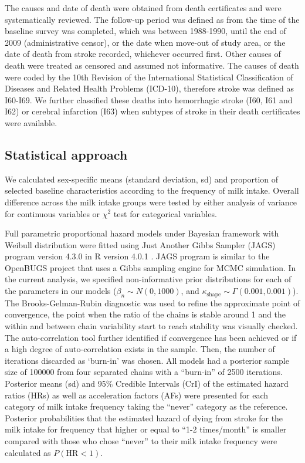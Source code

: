 \documentclass[nutrients,article,submit,moreauthors,pdftex]{mdpi}
\begin{document}
The causes and date of death were obtained from death certificates and
were systematically reviewed. The follow-up period was defined as from
the time of the baseline survey was completed, which was between
1988-1990, until the end of 2009 (administrative censor), or the date
when move-out of study area, or the date of death from stroke recorded,
whichever occurred first. Other causes of death were treated as censored
and assumed not informative. The causes of death were coded by the 10th
Revision of the International Statistical Classification of Diseases and
Related Health Problems (ICD-10), therefore stroke was defined as
I60-I69. We further classified these deaths into hemorrhagic stroke
(I60, I61 and I62) or cerebral infarction (I63) when subtypes of stroke
in their death certificates were available.

\hypertarget{statistical-approach}{%
\subsection{Statistical approach}\label{statistical-approach}}

We calculated sex-specific means (standard deviation, sd) and proportion
of selected baseline characteristics according to the frequency of milk
intake. Overall difference across the milk intake groups were tested by
either analysis of variance for continuous variables or \(\chi^2\) test
for categorical variables.

Full parametric proportional hazard models under Bayesian framework with
Weibull distribution were fitted using Just Another Gibbs Sampler (JAGS)
program \citep{Plummer2003} version 4.3.0 in R version 4.0.1
\citep{RCT2020}. JAGS program is similar to the OpenBUGS
\citep{Lunn2009} project that uses a Gibbs sampling engine for MCMC
simulation. In the current analysis, we specified non-informative prior
distributions for each of the parameters in our models
(\(\beta_n \sim N(0, 1000)\), and
\(\kappa_{\text{shape}} \sim \Gamma(0.001, 0.001)\)). The
Brooks-Gelman-Rubin diagnostic \citep{Brooks1998} was used to refine the
approximate point of convergence, the point when the ratio of the chains
is stable around 1 and the within and between chain variability start to
reach stability was visually checked. The auto-correlation tool further
identified if convergence has been achieved or if a high degree of
auto-correlation exists in the sample. Then, the number of iterations
discarded as `burn-in' was chosen. All models had a posterior sample
size of 100000 from four separated chains with a ``burn-in'' of 2500
iterations. Posterior means (sd) and 95\% Credible Intervals (CrI) of
the estimated hazard ratios (HRs) as well as acceleration factors (AFs)
were presented for each category of milk intake frequency taking the
``never'' category as the reference. Posterior probabilities that the
estimated hazard of dying from stroke for the milk intake for frequency
that higher or equal to ``1-2 times/month'' is smaller compared with
those who chose ``never'' to their milk intake frequency were calculated
as \(P(\text{HR} < 1)\).
\end{document}
